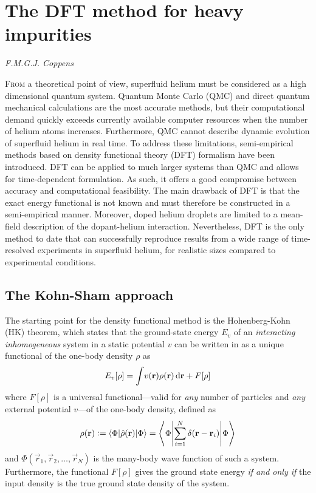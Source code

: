 \chapter{The DFT method for heavy impurities}\label{sec:dft-method}
	\epigraph{}{\textit{F.M.G.J. Coppens}}

	\lettrine[lines=4,findent=3pt,nindent=0pt]{\color{activeColor}F}{rom} a theoretical point of view, superfluid helium must be considered as a high dimensional quantum system. Quantum Monte Carlo (QMC) \citep{Kro02} and direct quantum mechanical \citep{deL06,deL10,Agu13} calculations are the most accurate methods, but their computational demand quickly exceeds currently available computer resources when the number of helium atoms increases. Furthermore, QMC cannot describe dynamic evolution of superfluid helium in real time. To address these limitations, semi-empirical methods based on  density functional theory (DFT) formalism have been introduced\citep{Str87a,Str87b,Dal95}. DFT can be applied to much larger systems than QMC and allows for time-dependent formulation. As such, it offers a good compromise between accuracy and computational feasibility. The main drawback of DFT is that the exact energy functional is not known and must therefore be constructed in a semi-empirical manner. Moreover, doped helium droplets are limited to a mean-field description of the dopant-helium interaction. Nevertheless, DFT is the only method to date that can successfully reproduce results from a wide range of time-resolved experiments in superfluid helium, for realistic sizes compared to experimental conditions.
	
	\section{The Kohn-Sham approach}	\label{sec:kohn-sham}
		The starting point for the density functional method is the Hohenberg-Kohn (HK) theorem\citep{Hohenberg1964}, which states that the ground-state energy $E_v$ of an \emph{interacting inhomogeneous} system in a static potential $v$ can be written in as a unique functional of the one-body density $\rho$ as
		\begin{align}
			E_v[\rho] = \int\!v(\bm{\mathrm{r}})\rho(\bm{\mathrm{r}})\,\mathrm{d}{\bm{\mathrm{r}}}+F[\rho] \label{eq1}
		\end{align}
		where $F[\rho]$ is a universal functional---valid for \emph{any} number of particles and \emph{any} external potential $v$---of the one-body density, defined as
		\begin{align}\label{eq:density-operator}
			\rho(\vec{r}) \vcentcolon= \ev**{\hat\rho(\vec{r})}{\Phi} = \ev**{\sum _{i=1}^{N}\delta(\vec{r}-\vec{r}_i)}{\Phi}
		\end{align}
		and $\Phi(\vec{r}_1,\vec{r}_2,\ldots,\vec{r}_N)$ is the many-body wave function of such a system. Furthermore, the functional $F[\rho]$ gives the ground state energy \emph{if and only if} the input density is the true ground state density of the system.
		

